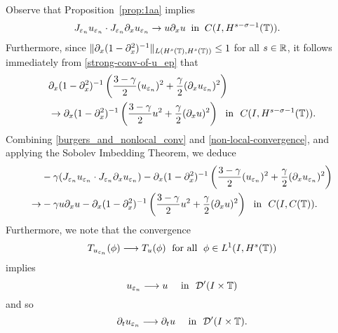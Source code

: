 %
Observe that Proposition~\ref{prop:1aa} implies
\begin{equation}
\begin{split}
\label{burgers_and_nonlocal_conv}
&  J_{\varepsilon_n} u_{\varepsilon_n} 
\cdot J_{\varepsilon_n} \partial_x u_{\varepsilon_n} 
\to  u \partial_x u \; \; 
\text{in} \; \;
C(I, H^{s-\sigma-1}(\mathbb{T})). 
\end{split}
\end{equation}
%
Furthermore, since $\|\partial_x (1-\partial_x^2)^{-1}\|_{L(H^s(\mathbb{T}), H^s(\mathbb{T}))}
\le 1$ for all $s \in \mathbb{R}$, it follows immediately from
\eqref{strong-conv-of-u_ep} that
\begin{equation}
\begin{split}
& \partial_x(1- \partial_x^2)^{-1} \left( \frac{3-\gamma}{2}
(u_{\varepsilon_n})^2
+ \frac{\gamma}{2} (\partial_x u_{\varepsilon_n})^2 \right )
\\
& \to
\partial_x(1- \partial_x^2)^{-1} \left( \frac{3-\gamma}{2} u^2
+ \frac{\gamma}{2} (\partial_x u)^2 \right ) \ \
\text{in} \ \ C(I, H^{s-\sigma-1}(\mathbb{T})).
\label{non-local-convergence}
\end{split}
\end{equation}
Combining \eqref{burgers_and_nonlocal_conv} and
\eqref{non-local-convergence}, and applying the Sobolev Imbedding
Theorem, we deduce 
\begin{equation}
\begin{split}
& -\gamma (J_{\varepsilon_n} u_{\varepsilon_n} \cdot J_{\varepsilon_n} \partial_x
u_{\varepsilon_n}) - \partial_x(1- \partial_x^2)^{-1} \left( \frac{3-\gamma}{2}
(u_{\varepsilon_n})^2
+ \frac{\gamma}{2} (\partial_x u_{\varepsilon_n})^2 \right )
\\
\to & -\gamma u \partial_x u -
\partial_x(1- \partial_x^2)^{-1} \left( \frac{3-\gamma}{2} u^2
+ \frac{\gamma}{2} (\partial_x u)^2 \right ) \ \
\text{in} \ \ C(I, C(\mathbb{T})).
\label{loc-non-loc-tog}
\end{split}
\end{equation}
Furthermore, we note that the convergence  
%
\begin{equation}
\label{weak-conv-2}
T_{u_{\varepsilon_n}}(\phi)  \longrightarrow  T_u(\phi) \;
\ \text{for all} \  \;  \phi \in L^1(I, H^{s}(\mathbb{T}))
\end{equation}
%
implies
%
\begin{equation}
u_{\varepsilon_n}  \longrightarrow  u
\quad
\ \text{in} \   \,\,
\mathcal{D}'(I\times \mathbb{T})
\end{equation}
%
and so
%
\begin{equation}
\label{distib-conv-2}
\partial_tu_{\varepsilon_n}  \longrightarrow  \partial_tu
\quad
\ \text{in} \   \,\, \mathcal{D}'(I\times \mathbb{T}).
\end{equation}
